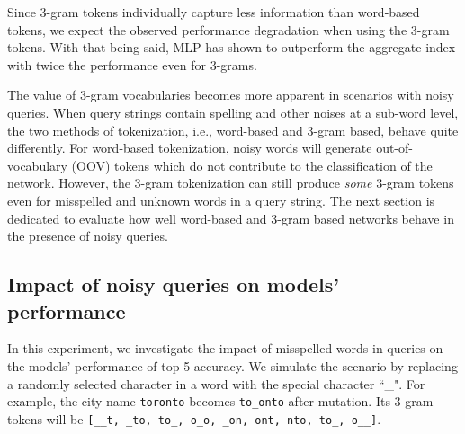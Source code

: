 Since 3-gram tokens individually capture less information than word-based tokens, we expect the observed performance degradation when using the 3-gram tokens. With that being said, MLP has shown to outperform the aggregate index with twice the performance even for 3-grams.

The value of 3-gram vocabularies becomes more apparent in scenarios with noisy queries.  When query strings contain spelling and other noises at a sub-word level, the two methods of tokenization, i.e., word-based and 3-gram based, behave quite differently.
For word-based tokenization, noisy words will generate out-of-vocabulary (OOV) tokens
which do not contribute to the classification of the network.  However, the 3-gram tokenization can still produce {\em some} 3-gram tokens even for misspelled and unknown words in a query string.  The next section is dedicated to evaluate how well word-based and 3-gram based networks behave in the presence of noisy queries.

\subsection{Impact of noisy queries on models' performance}
\label{subsection:expt_3gram_resiliency}


In this experiment, we investigate the impact of misspelled words in queries on the models' performance of top-5 accuracy. We simulate the scenario by replacing a randomly selected character in a word with the special character ``\_". For example, the city name \verb|toronto| becomes \verb|to_onto| after mutation. Its 3-gram tokens will be \verb|[__t, _to, to_, o_o, _on, ont, nto, to_, o__]|.



